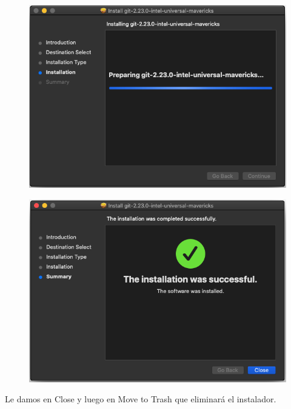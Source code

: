 \documentclass{article}
\begin{document}
\newpage

\begin{figure}[h!]
  \centering
  \includegraphics[scale=0.5]{./Pictures/032_mac_git.png}
\end{figure}

\begin{figure}[h!]
  \centering
  \includegraphics[scale=0.5]{./Pictures/033_mac_git.png}
\end{figure}

Le damos en Close y luego en Move to Trash que eliminará el instalador.
\end{document}
